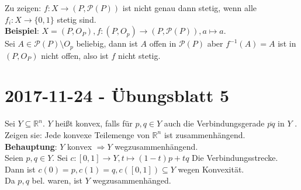 \begin{problem*}[3b]
Zu zeigen: $f: X \to (P,\mathcal{P}(P))$ ist nicht genau dann stetig, wenn alle $f_i: X \to \{ 0,1 \}$ stetig sind.\\
\textbf{Beispiel}: $X = (P, O_P), f: (P, O_p) \to (P, \mathcal{P}(P)), a \mapsto a$.\\
Sei $ A \in \mathcal{P}(P) \setminus O_p$ beliebig, dann ist $ A $ offen in $\mathcal{P}(P)$ aber 
$f^{-1}(A) = A$ ist in $(P, O_P)$ nicht offen, also ist $f$ nicht stetig.
\end{problem*}
% 
\newpage
\section{2017-11-24 - Übungsblatt 5}
% 
\begin{problem*}[1a]

Sei $ Y \subseteq \mathbb{R}^n$. $ Y $ heißt konvex, falls für $p, q \in Y$ auch die Verbindungsgerade $\overline{pq}$ in $Y$
.\\
Zeigen sie: Jede konvexe Teilemenge von $ \mathbb{R}^n$ ist zusammenhängend. \\
\textbf{Behauptung}: $Y $ konvex $ \Rightarrow Y $ wegzusammenhängend.\\
Seien $p, q \in Y.$ Sei $c: [0,1] \to Y, t \mapsto (1-t)p +tq $ Die Verbindungsstrecke.
Dann ist $ c(0) = p, c(1) = q, c([0,1]) \subseteq Y$ wegen Konvexität. \\
Da $ p,q $ bel. waren, ist $ Y $ wegzusammenhänged. 
\end{problem*}

